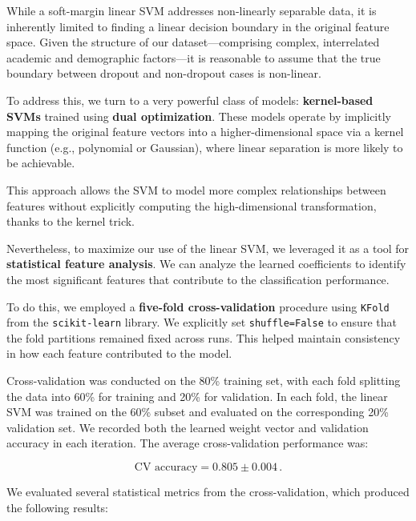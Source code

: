 \documentclass[12pt]{article}
\begin{document}
While a soft-margin linear SVM addresses non-linearly separable data, it is inherently limited to finding a linear decision boundary in the original feature space. Given the structure of our dataset—comprising complex, interrelated academic and demographic factors—it is reasonable to assume that the true boundary between dropout and non-dropout cases is non-linear.

To address this, we turn to a very powerful class of models: \textbf{kernel-based SVMs} trained using \textbf{dual optimization}. These models operate by implicitly mapping the original feature vectors into a higher-dimensional space via a kernel function (e.g., polynomial or Gaussian), where linear separation is more likely to be achievable.

This approach allows the SVM to model more complex relationships between features without explicitly computing the high-dimensional transformation, thanks to the kernel trick. 

Nevertheless, to maximize our use of the linear SVM, we leveraged it as a tool for \textbf{statistical feature analysis}. We can analyze the learned coefficients to identify the most significant features that contribute to the classification performance.

To do this, we employed a \textbf{five-fold cross-validation} procedure using \texttt{KFold} from the \texttt{scikit-learn} library. We explicitly set \texttt{shuffle=False} to ensure that the fold partitions remained fixed across runs. This helped maintain consistency in how each feature contributed to the model.

Cross-validation was conducted on the 80\% training set, with each fold splitting the data into 60\% for training and 20\% for validation. In each fold, the linear SVM was trained on the 60\% subset and evaluated on the corresponding 20\% validation set. We recorded both the learned weight vector and validation accuracy in each iteration. The average cross-validation performance was:

\[
\text{CV accuracy} = 0.805 \pm 0.004\, .
\]

We evaluated several statistical metrics from the cross-validation, which produced the following results:
\end{document}
